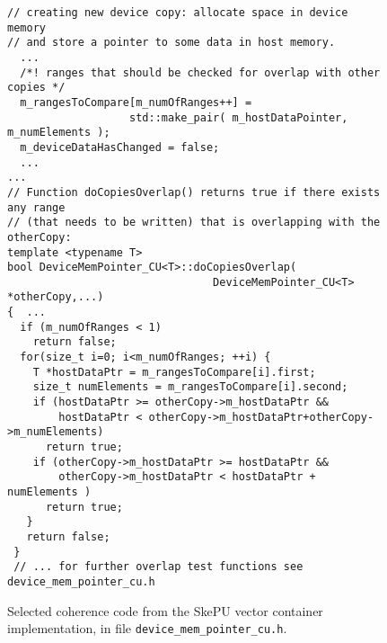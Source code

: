   
\begin{figure}
%
%
%
\begin{small}
\begin{verbatim}
// creating new device copy: allocate space in device memory
// and store a pointer to some data in host memory.
  ...
  /*! ranges that should be checked for overlap with other copies */
  m_rangesToCompare[m_numOfRanges++] =
                   std::make_pair( m_hostDataPointer, m_numElements );
  m_deviceDataHasChanged = false;
  ...
...
// Function doCopiesOverlap() returns true if there exists any range
// (that needs to be written) that is overlapping with the otherCopy:
template <typename T>
bool DeviceMemPointer_CU<T>::doCopiesOverlap(
                                DeviceMemPointer_CU<T> *otherCopy,...)
{  ...
  if (m_numOfRanges < 1)
    return false;
  for(size_t i=0; i<m_numOfRanges; ++i) {
    T *hostDataPtr = m_rangesToCompare[i].first;
    size_t numElements = m_rangesToCompare[i].second;
    if (hostDataPtr >= otherCopy->m_hostDataPtr &&
        hostDataPtr < otherCopy->m_hostDataPtr+otherCopy->m_numElements)
      return true;
    if (otherCopy->m_hostDataPtr >= hostDataPtr &&
        otherCopy->m_hostDataPtr < hostDataPtr + numElements )
      return true;
   }
   return false;
 }
 // ... for further overlap test functions see device_mem_pointer_cu.h
\end{verbatim}
\end{small}
%
\caption{\label{fig:skepucoherence3}Selected coherence code from the SkePU vector container implementation, in file \texttt{device\_mem\_pointer\_cu.h}.}
\end{figure}

